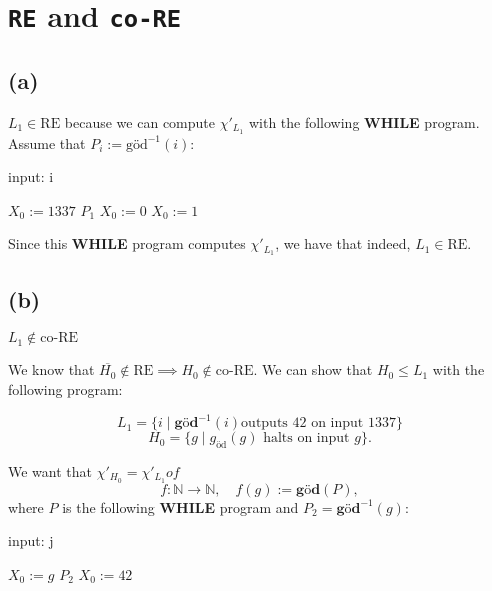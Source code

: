 

\setcounter{section}{3}
\usepackage{algorithm, algpseudocode, listings}



\section{\lstinline|RE| and \lstinline|co-RE|}

\subsection{(a)}

$L_1 \in \text{RE}$ because we can compute $\chi'_{L_1}$ with the following \textbf{WHILE} program. Assume that $P_i := \text{göd}^{-1}(i)$:

\begin{algorithm}
    \caption{input: i}
    \begin{algorithmic}[1]
        \State $X_0 := 1337$
        \State $P_1$
            \State $X_0 := 0$
        \EndWhile
        \State $X_0 := 1$
    \end{algorithmic}
\end{algorithm}

\noindent
Since this \textbf{WHILE} program computes $\chi'_{L_1}$, we have that indeed, $L_1 \in \text{RE}$.

\subsection{(b)}
$L_1 \notin \text{co-RE}$

\noindent
We know that $\overline{H_0} \notin \text{RE} \implies H_0 \notin \text{co-RE}$.  
We can show that $H_0 \leq L_1$ with the following program:

\[
L_1 = \{i \mid \textbf{göd}^{-1}(i) \text{outputs 42 on input 1337} \}
\]
\[
H_0 = \{g \mid g_{\text{öd}}(g) \text{ halts on input } g\}.
\]

We want that $\chi'_{H_0} = \chi'_{L_1} o f$   
\[
f: \mathbb{N} \to \mathbb{N}, \quad f(g) := \textbf{göd}(P),
\]
where $P$ is the following \textbf{WHILE} program and $P_2 = \textbf{göd}^{-1}(g)$:

\begin{algorithm}
    \caption{input: j}
    \begin{algorithmic}[1]
        \State $X_0 := g$
        \State $P_2$
        \State $X_0 := 42$
    \end{algorithmic}
\end{algorithm}

